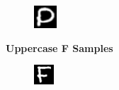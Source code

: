 \documentclass[conference]{IEEEtran}
\begin{document}
\begin{figure}[h]
\begin{subfigure}{.10\textwidth}
        \label{fig:issue_D03}
    \end{subfigure}%
    \begin{subfigure}{.10\textwidth}
        \centering
        \includegraphics[width=.90\textwidth]{./images/issues/D-04.png}
        \label{fig:issue_D04}
    \end{subfigure}\par\medskip
    \textbf{Uppercase F Samples}\par\medskip
    \begin{subfigure}{.10\textwidth}
        \centering
        \includegraphics[width=.90\textwidth]{./images/issues/F-0.png}

\end{subfigure}
\end{figure}
\end{document}
